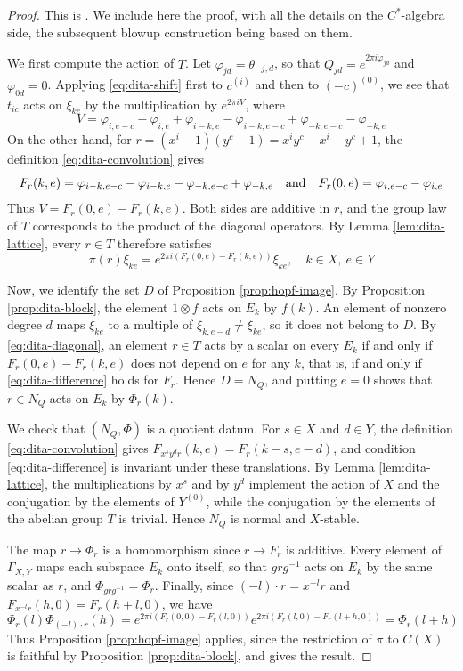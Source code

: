 \documentclass[11pt,reqno]{amsart}
\theoremstyle{definition}
\numberwithin{equation}{section}
\begin{document}
\begin{proof}
This is \cite[Theorem 4.4]{BO26}. We include here the proof, with all the details on the $C^*$-algebra side, the subsequent blowup construction being based on them.

We first compute the action of $T$. Let $\varphi_{jd}=\theta_{-j,d}$, so that $Q_{jd}=e^{2\pi i\varphi_{jd}}$ and $\varphi_{0d}=0$. Applying \eqref{eq:dita-shift} first to $c^{(i)}$ and then to $(-c)^{(0)}$, we see that $t_{ic}$ acts on $\xi_{ke}$ by the multiplication by $e^{2\pi i V}$, where
$$V=\varphi_{i,e-c}-\varphi_{i,e}+\varphi_{i-k,e}-\varphi_{i-k,e-c}+\varphi_{-k,e-c}-\varphi_{-k,e}$$
On the other hand, for $r=(x^i-1)(y^c-1)=x^iy^c-x^i-y^c+1$, the definition \eqref{eq:dita-convolution} gives
$$F_r(k,e)=\varphi_{i-k,e-c}-\varphi_{i-k,e}-\varphi_{-k,e-c}+\varphi_{-k,e}
\quad{\rm and}\quad
F_r(0,e)=\varphi_{i,e-c}-\varphi_{i,e}$$
Thus $V=F_r(0,e)-F_r(k,e)$. Both sides are additive in $r$, and the group law of $T$ corresponds to the product of the diagonal operators. By Lemma \ref{lem:dita-lattice}, every $r\in T$ therefore satisfies
\begin{equation}\label{eq:dita-diagonal}
\pi(r)\xi_{ke}=e^{2\pi i(F_r(0,e)-F_r(k,e))}\xi_{ke},
\quad k\in X,\ e\in Y
\end{equation}

Now, we identify the set $D$ of Proposition \ref{prop:hopf-image}. By Proposition \ref{prop:dita-block}, the element $1\otimes f$ acts on $E_k$ by $f(k)$. An element of nonzero degree $d$ maps $\xi_{ke}$ to a multiple of $\xi_{k,e-d}\neq\xi_{ke}$, so it does not belong to $D$. By \eqref{eq:dita-diagonal}, an element $r\in T$ acts by a scalar on every $E_k$ if and only if $F_r(0,e)-F_r(k,e)$ does not depend on $e$ for any $k$, that is, if and only if \eqref{eq:dita-difference} holds for $F_r$. Hence $D=N_Q$, and putting $e=0$ shows that $r\in N_Q$ acts on $E_k$ by $\Phi_r(k)$.

We check that $(N_Q,\Phi)$ is a quotient datum. For $s\in X$ and $d\in Y$, the definition \eqref{eq:dita-convolution} gives $F_{x^sy^dr}(k,e)=F_r(k-s,e-d)$, and condition \eqref{eq:dita-difference} is invariant under these translations. By Lemma \ref{lem:dita-lattice}, the multiplications by $x^s$ and by $y^d$ implement the action of $X$ and the conjugation by the elements of $Y^{(0)}$, while the conjugation by the elements of the abelian group $T$ is trivial. Hence $N_Q$ is normal and $X$-stable.

The map $r\to\Phi_r$ is a homomorphism since $r\to F_r$ is additive. Every element of $\Gamma_{X,Y}$ maps each subspace $E_k$ onto itself, so that $grg^{-1}$ acts on $E_k$ by the same scalar as $r$, and $\Phi_{grg^{-1}}=\Phi_r$. Finally, since $(-l)\cdot r=x^{-l}r$ and $F_{x^{-l}r}(h,0)=F_r(h+l,0)$, we have
$$\Phi_r(l)\Phi_{(-l)\cdot r}(h)
=e^{2\pi i(F_r(0,0)-F_r(l,0))}e^{2\pi i(F_r(l,0)-F_r(l+h,0))}
=\Phi_r(l+h)$$
Thus Proposition \ref{prop:hopf-image} applies, since the restriction of $\pi$ to $C(X)$ is faithful by Proposition \ref{prop:dita-block}, and gives the result.
\end{proof}
\end{document}
